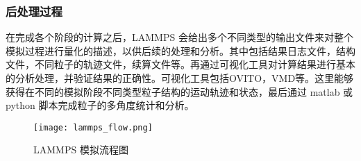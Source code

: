 \subsubsection{后处理过程}
在完成各个阶段的计算之后，LAMMPS 会给出多个不同类型的输出文件来对整个模拟过程进行量化的描述，以供后续的处理和分析。其中包括结果日志文件，结构文件，不同粒子的轨迹文件，续算文件等。再通过可视化工具对计算结果进行基本的分析处理，并验证结果的正确性。可视化工具包括OVITO，VMD等。这里能够获得在不同的模拟阶段不同类型粒子结构的运动轨迹和状态，最后通过 matlab 或 python 脚本完成粒子的多角度统计和分析。

 \begin{figure}[h]
  \centering
  \texttt{[image: lammps\_flow.png]}
  \caption{LAMMPS 模拟流程图}
 \end{figure}

